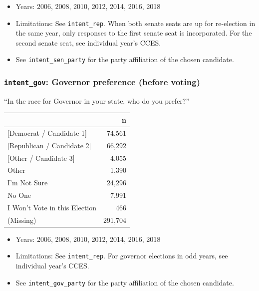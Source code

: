 \documentclass[10pt,article,oneside]{memoir}
\theoremstyle{definition}
\begin{document}
\begin{itemize}
\tightlist
\item
  Years: 2006, 2008, 2010, 2012, 2014, 2016, 2018
\item
  Limitations: See \texttt{intent\_rep}. When both senate seats are up
  for re-election in the same year, only responses to the first senate
  seat is incorporated. For the second senate seat, see individual
  year's CCES.
\item
  See \texttt{intent\_sen\_party} for the party affiliation of the
  chosen candidate.
\end{itemize}

\hypertarget{intent_gov-governor-preference-before-voting}{%
\subsubsection{\texorpdfstring{\texttt{intent\_gov}: Governor preference
(before
voting)}{intent\_gov: Governor preference (before voting)}}\label{intent_gov-governor-preference-before-voting}}

``In the race for Governor in your state, who do you prefer?''

\begin{table}[H]
\centering
\begin{tabular}{lr}
\toprule
 & n\\
\midrule
{[Democrat / Candidate 1]} & 74,561\\
{[Republican / Candidate 2]} & 66,292\\
{[Other / Candidate 3]} & 4,055\\
Other & 1,390\\
I'm Not Sure & 24,296\\
No One & 7,991\\
I Won't Vote in this Election & 466\\
(Missing) & 291,704\\
\bottomrule
\end{tabular}
\end{table}

\begin{itemize}
\tightlist
\item
  Years: 2006, 2008, 2010, 2012, 2014, 2016, 2018
\item
  Limitations: See \texttt{intent\_rep}. For governor elections in odd
  years, see individual year's CCES.
\item
  See \texttt{intent\_gov\_party} for the party affiliation of the
  chosen candidate.
\end{itemize}
\end{document}
